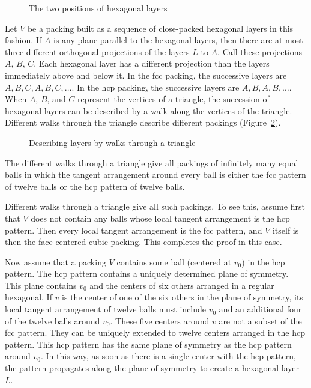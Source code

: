 \begin{figure}[htb]
  \centering
  \caption{The two positions of hexagonal layers}
  \label{fig:two-holes}
\end{figure}

Let $V$ be a packing built as a sequence of close-packed hexagonal
layers in this fashion.  If $A$ is any plane parallel to the hexagonal
layers, then there are at most three different orthogonal projections
of the layers $L$ to $A$.  Call these projections $A$, $B$, $C$.  Each
hexagonal layer has a different projection than the layers immediately
above and below it.  In the fcc packing, the successive layers are
$A,B,C,A,B,C,\ldots$.  In the hcp packing, the successive layers are
$A,B,A,B,\ldots$.  When $A$, $B$, and $C$ represent the vertices of a
triangle, the succession of hexagonal layers can be described by a
walk along the vertices of the triangle. Different walks through the
triangle describe different packings (Figure~\ref{fig:fcc-tri}).

\begin{figure}[htb]
  \centering
  \caption{Describing layers by walks through a triangle}
  \label{fig:fcc-tri}
\end{figure}

The different walks through a triangle give all packings of infinitely
many equal balls in which the tangent arrangement around every ball is
either the fcc pattern of twelve balls or the hcp pattern of twelve
balls.

Different walks through a triangle give all such packings.  To see
this, assume first that $V$ does not contain any balls whose local
tangent arrangement is the hcp pattern.  Then every local tangent
arrangement is the fcc pattern, and $V$ itself is then the
face-centered cubic packing.  This completes the proof in this case.

Now assume that a packing $V$ contains some ball (centered at $v_0$)
in the hcp pattern. The hcp pattern contains a uniquely determined
plane of symmetry. This plane contains $v_0$ and the centers of six
others arranged in a regular hexagonal. If $v$ is the center of one of
the six others in the plane of symmetry, its local tangent arrangement
of twelve balls must include $v_0$ and an additional four of the
twelve balls around $v_0$. These five centers around $v$ are not a
subset of the fcc pattern. They can be uniquely extended to twelve
centers arranged in the hcp pattern. This hcp pattern has the same
plane of symmetry as the hcp pattern around $v_0$. In this way, as
soon as there is a single center with the hcp pattern, the pattern
propagates along the plane of symmetry to create a hexagonal layer
$L$.

